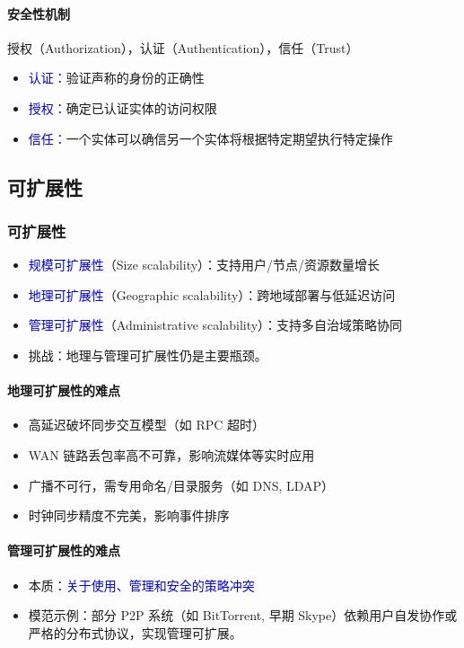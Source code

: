 \documentclass[UTF8,a4paper,11pt]{ctexart}
\newcommand{\blue}[1]{\textcolor{blue}{#1}}
\begin{document}
\paragraph{安全性机制}
授权（Authorization），认证（Authentication），信任（Trust）
\begin{itemize}
  \item \blue{认证：}验证声称的身份的正确性
  \item \blue{授权：}确定已认证实体的访问权限
  \item \blue{信任：}一个实体可以确信另一个实体将根据特定期望执行特定操作
\end{itemize}

\subsection{可扩展性}

\subsubsection*{可扩展性}

\begin{itemize}
  \item \blue{规模可扩展性}（Size scalability）：支持用户/节点/资源数量增长
  \item \blue{地理可扩展性}（Geographic scalability）：跨地域部署与低延迟访问
  \item \blue{管理可扩展性}（Administrative scalability）：支持多自治域策略协同
  \item 挑战：地理与管理可扩展性仍是主要瓶颈。
\end{itemize}

\paragraph{地理可扩展性的难点}
\begin{itemize}
  \item 高延迟破坏同步交互模型（如 RPC 超时）
  \item WAN 链路丢包率高不可靠，影响流媒体等实时应用
  \item 广播不可行，需专用命名/目录服务（如 DNS, LDAP）
  \item 时钟同步精度不完美，影响事件排序
\end{itemize}

\paragraph{管理可扩展性的难点}
\begin{itemize}
  \item 本质：\blue{关于使用、管理和安全的策略冲突}
  \item 模范示例：部分 P2P 系统（如 BitTorrent, 早期 Skype）依赖用户自发协作或严格的分布式协议，实现管理可扩展。
\end{itemize}
\end{document}
